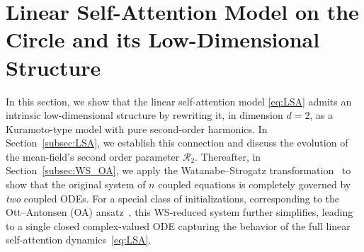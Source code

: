 \documentclass[10pt]{article}
\theoremstyle{definition}
\theoremstyle{definition}
\numberwithin{equation}{section}
\newcommand{\CR}{\mathcal{R}}
\renewcommand{\P}{\mathsf{P}}
\begin{document}





\section{Linear Self-Attention Model on the Circle and its Low-Dimensional Structure}\label{sec:2}

In this section,
we show that the linear self-attention model \eqref{eq:LSA} admits an intrinsic low-dimensional structure
by rewriting it, in dimension $d = 2$, as a Kuramoto-type model with pure second-order harmonics.
In Section~\ref{subsec:LSA}, we establish this connection and discuss the evolution of the mean-field's second order parameter $\CR_2$. Thereafter, in Section~\ref{subsec:WS_OA},
we apply the Watanabe--Strogatz transformation~\cite{watanabe_integrability} to show that the original system of $n$ coupled equations is completely governed by \emph{two} coupled ODEs.
For a special class of initializations, corresponding to the Ott--Antonsen (OA) ansatz~\cite{ott2008low}, this WS-reduced system further simplifies, leading to a single closed complex-valued ODE capturing the behavior of the full linear self-attention dynamics~\eqref{eq:LSA}.

\end{document}
